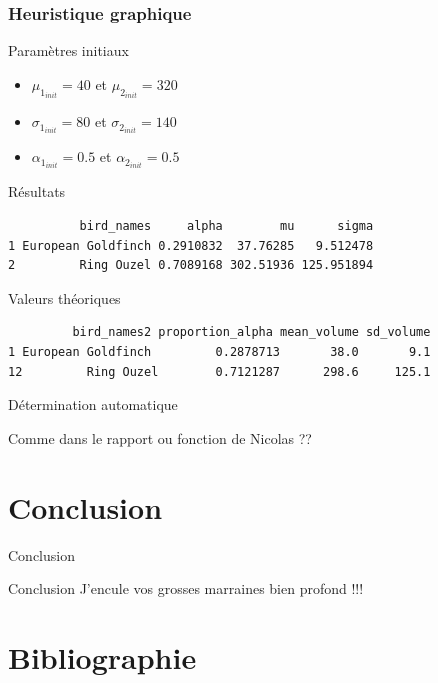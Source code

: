 \documentclass[11pt]{beamer}
\begin{document}
	\begin{frame}[fragile]\frametitle{Heuristique graphique}
		\begin{block}{\scriptsize Paramètres initiaux}
			\begin{itemize}
				\scriptsize
				\centering
				\item $\mu_{1_{init}} =  40$ et $\mu_{2_{init}} = 320$
				\item $\sigma_{1_{init}} =  80$ et $\sigma_{2_{init}} = 140$
				\item $\alpha_{1_{init}} = 0.5$ et $\alpha_{2_{init}} = 0.5$
			\end{itemize}
		\end{block}
		\begin{block}{\scriptsize Résultats}
			\scriptsize
			\begin{verbatim}
          bird_names     alpha        mu      sigma
1 European Goldfinch 0.2910832  37.76285   9.512478
2         Ring Ouzel 0.7089168 302.51936 125.951894
			\end{verbatim}
		\end{block}
		\begin{block}{\scriptsize Valeurs théoriques}
			\scriptsize
			\begin{verbatim}
         bird_names2 proportion_alpha mean_volume sd_volume
1 European Goldfinch         0.2878713       38.0       9.1
12         Ring Ouzel        0.7121287      298.6     125.1
			\end{verbatim}
		\end{block}
	\end{frame}


	\begin{frame}{Détermination automatique}
		\begin{block}{}
			Comme dans le rapport ou fonction de Nicolas ??
		\end{block}
	\end{frame}


	\section{Conclusion}

	\begin{frame}{Conclusion}
		\begin{block}{Conclusion}
			J'encule vos grosses marraines bien profond !!!
		\end{block}
	\end{frame}


	\section{Bibliographie}
\end{document}
